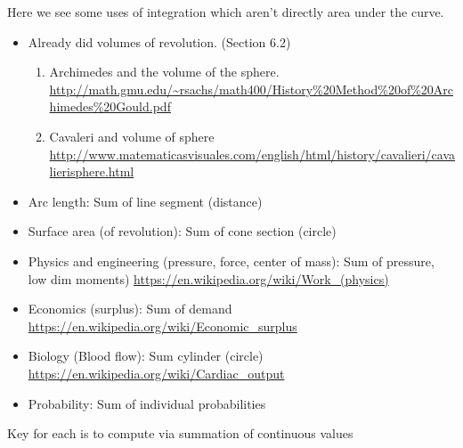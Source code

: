 \documentclass{article}
\begin{document}
Here we see some uses of integration which aren't directly area under the curve.
\begin{itemize}
\item Already did volumes of revolution. (Section 6.2)
\begin{enumerate}
\item Archimedes and the volume of the sphere. \\ \url{http://math.gmu.edu/~rsachs/math400/History%20Method%20of%20Archimedes%20Gould.pdf}
\item Cavaleri and volume of sphere \\
\url{http://www.matematicasvisuales.com/english/html/history/cavalieri/cavalierisphere.html}
\end{enumerate}
\item Arc length: Sum of line segment (distance)
\item Surface area (of revolution): Sum of cone section (circle)
\item Physics and engineering (pressure, force, center of mass): Sum of pressure, low dim moments) \url{https://en.wikipedia.org/wiki/Work_(physics)}
\item Economics (surplus): Sum of demand \url{https://en.wikipedia.org/wiki/Economic_surplus}
\item Biology (Blood flow): Sum cylinder (circle) \url{https://en.wikipedia.org/wiki/Cardiac_output}
\item Probability: Sum of individual probabilities
\end{itemize}
Key for each is to compute via summation of continuous values
%
\end{document}
